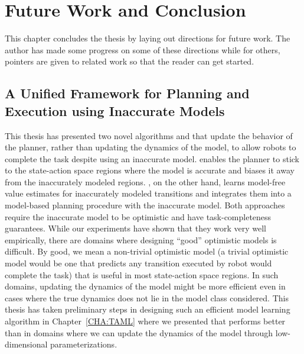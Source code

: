 
\chapter{Future Work and Conclusion}
\label{cha:future-work-concl}

This chapter concludes the thesis by laying out directions for future
work. The author has made some progress on some of these directions
while for others, pointers are given to related work so that the
reader can get started.

\section{A Unified Framework for Planning and Execution using
  Inaccurate Models}
\label{sec:unified-framework}

This thesis has presented two novel algorithms \cmax{} and \cmaxpp{} that update the
behavior of the planner, rather than updating the dynamics of the
model, to allow robots to complete the task despite using an
inaccurate model. \cmax{} enables the planner to stick to the
state-action space regions where the model is accurate and biases it
away from the inaccurately modeled regions. \cmaxpp{}, on the other
hand, learns model-free value estimates for inaccurately modeled
transitions and integrates them into a model-based planning procedure
with the inaccurate model. Both approaches require the inaccurate
model to be optimistic and have task-completeness guarantees. While
our experiments have shown that they work very well empirically, there
are domains where designing ``good'' optimistic models is
difficult. By good, we mean a non-trivial optimistic model (a trivial
optimistic model would be one that predicts any transition executed by
robot would complete the task) that is useful in most state-action
space regions. In such domains, updating the dynamics of the model
might be more efficient even in cases where the true dynamics does not
lie in the model class considered. This thesis has taken preliminary
steps in designing such an efficient model learning algorithm in
Chapter~\ref{CHA:TAML} where we presented \taml{} that performs better
than \cmax{} in domains where we can update the dynamics of the model
through low-dimensional parameterizations.

